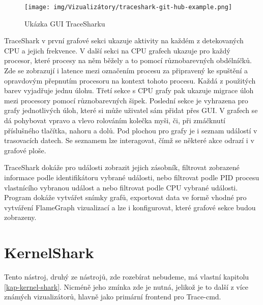 \begin{figure}[p]\centering
    \texttt{[image: img/Vizualizátory/traceshark-git-hub-example.png]}
    \caption{Ukázka GUI TraceSharku}
    \label{traceshark-github}
\end{figure}

TraceShark v první grafové sekci ukazuje aktivity na každém z detekovaných CPU a jejich frekvence. V další sekci na CPU grafech ukazuje pro každý procesor, které procesy na něm běžely a to pomocí různobarevných obdélníčků. Zde se zobrazují i latence mezi označením procesu za připravený ke spuštění a opravdovým přepnutím procesoru na kontext tohoto procesu. Každá z použitých barev vyjadřuje jednu úlohu. Třetí sekce s CPU grafy pak ukazuje migrace úloh mezi procesory pomocí různobarevných šipek. Poslední sekce je vyhrazena pro grafy jednotlivých úloh, které si může uživatel sám přidat přes GUI. V grafech se dá pohybovat vpravo a vlevo rolováním kolečka myši, či, při zmáčknutí příslušného tlačítka, nahoru a dolů. Pod plochou pro grafy je i seznam událostí v trasovacích datech. Se seznamem lze interagovat, čímž se některé akce odrazí i v grafové ploše.

TraceShark dokáže pro události zobrazit jejich zásobník, filtrovat zobrazené informace podle identifikátoru vybrané události, nebo filtrovat podle PID procesu vlastnícího vybranou událost a nebo filtrovat podle CPU vybrané události. Program dokáže vytvářet snímky grafů, exportovat data ve formě vhodné pro vytváření FlameGraph vizualizací a lze i konfigurovat, které grafové sekce budou zobrazeny.

\section{KernelShark}

Tento nástroj, druhý ze  nástrojů, zde rozebírat nebudeme, má vlastní kapitolu \ref{kap-kernel-shark}. Nicméně jeho zmínka zde je nutná, jelikož je to další z více známých vizualizátorů, hlavně jako primární frontend pro Trace-cmd.